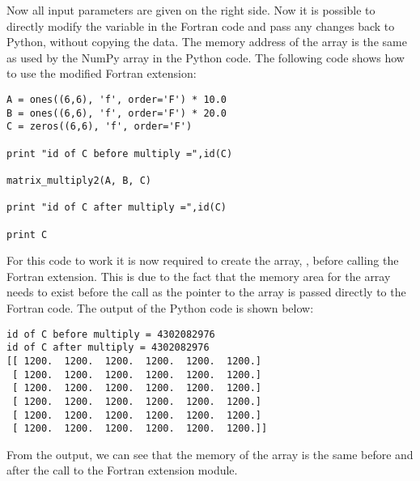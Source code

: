 Now all input parameters are given on the right side. Now it is possible to directly modify the  variable in the Fortran code and pass any changes back to Python, without copying the data. The memory address of the array is the same as used by the NumPy array in the Python code. The following code shows how to use the modified Fortran extension:

\fmode

\begin{lstlisting}
A = ones((6,6), 'f', order='F') * 10.0
B = ones((6,6), 'f', order='F') * 20.0
C = zeros((6,6), 'f', order='F')

print "id of C before multiply =",id(C)

matrix_multiply2(A, B, C)

print "id of C after multiply =",id(C)

print C
\end{lstlisting}

For this code to work it is now required to create the array, , before calling the Fortran extension. This is due to the fact that the memory area for the array needs to exist before the call as the pointer to the array is passed directly to the Fortran code. The output of the Python code is shown below:

\cmdmode

\begin{lstlisting}
id of C before multiply = 4302082976
id of C after multiply = 4302082976
[[ 1200.  1200.  1200.  1200.  1200.  1200.]
 [ 1200.  1200.  1200.  1200.  1200.  1200.]
 [ 1200.  1200.  1200.  1200.  1200.  1200.]
 [ 1200.  1200.  1200.  1200.  1200.  1200.]
 [ 1200.  1200.  1200.  1200.  1200.  1200.]
 [ 1200.  1200.  1200.  1200.  1200.  1200.]]
\end{lstlisting}

From the output, we can see that the memory of the array is the same before and after the call to the Fortran extension module.


























